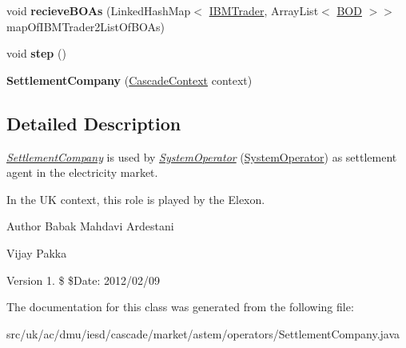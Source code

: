 \begin{DoxyCompactItemize}
\item 
\hypertarget{classuk_1_1ac_1_1dmu_1_1iesd_1_1cascade_1_1market_1_1astem_1_1operators_1_1_settlement_company_a6cf6210306ec71da3b37283425b20822}{void {\bfseries recieve\-B\-O\-As} (Linked\-Hash\-Map$<$ \hyperlink{interfaceuk_1_1ac_1_1dmu_1_1iesd_1_1cascade_1_1market_1_1_i_b_m_trader}{I\-B\-M\-Trader}, Array\-List$<$ \hyperlink{classuk_1_1ac_1_1dmu_1_1iesd_1_1cascade_1_1agents_1_1aggregators_1_1_b_o_d}{B\-O\-D} $>$$>$ map\-Of\-I\-B\-M\-Trader2\-List\-Of\-B\-O\-As)}\label{classuk_1_1ac_1_1dmu_1_1iesd_1_1cascade_1_1market_1_1astem_1_1operators_1_1_settlement_company_a6cf6210306ec71da3b37283425b20822}

\item 
\hypertarget{classuk_1_1ac_1_1dmu_1_1iesd_1_1cascade_1_1market_1_1astem_1_1operators_1_1_settlement_company_a7c560cc452641fba45cb3de7811d3fa6}{void {\bfseries step} ()}\label{classuk_1_1ac_1_1dmu_1_1iesd_1_1cascade_1_1market_1_1astem_1_1operators_1_1_settlement_company_a7c560cc452641fba45cb3de7811d3fa6}

\item 
\hypertarget{classuk_1_1ac_1_1dmu_1_1iesd_1_1cascade_1_1market_1_1astem_1_1operators_1_1_settlement_company_a71d273248a276e588181980b9da541bb}{{\bfseries Settlement\-Company} (\hyperlink{classuk_1_1ac_1_1dmu_1_1iesd_1_1cascade_1_1context_1_1_cascade_context}{Cascade\-Context} context)}\label{classuk_1_1ac_1_1dmu_1_1iesd_1_1cascade_1_1market_1_1astem_1_1operators_1_1_settlement_company_a71d273248a276e588181980b9da541bb}

\end{DoxyCompactItemize}


\subsection{Detailed Description}
{\itshape \hyperlink{classuk_1_1ac_1_1dmu_1_1iesd_1_1cascade_1_1market_1_1astem_1_1operators_1_1_settlement_company}{Settlement\-Company}} is used by {\itshape \hyperlink{classuk_1_1ac_1_1dmu_1_1iesd_1_1cascade_1_1market_1_1astem_1_1operators_1_1_system_operator}{System\-Operator}} (\hyperlink{classuk_1_1ac_1_1dmu_1_1iesd_1_1cascade_1_1market_1_1astem_1_1operators_1_1_system_operator}{System\-Operator}) as settlement agent in the electricity market. 

In the U\-K context, this role is played by the {\ttfamily Elexon}.

\begin{DoxyAuthor}{Author}
Babak Mahdavi Ardestani 

Vijay Pakka 
\end{DoxyAuthor}
\begin{DoxyVersion}{Version}
1. \$ \$\-Date\-: 2012/02/09 
\end{DoxyVersion}


The documentation for this class was generated from the following file\-:\begin{DoxyCompactItemize}
\item 
src/uk/ac/dmu/iesd/cascade/market/astem/operators/Settlement\-Company.\-java\end{DoxyCompactItemize}
